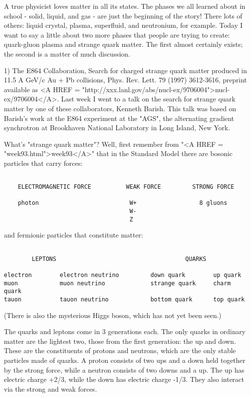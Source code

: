 


A true physicist loves matter in all its states.  The phases we all
learned about in school - solid, liquid, and gas - are just the
beginning of the story!  There lots of others: liquid crystal, plasma,
superfluid, and neutronium, for example.  Today I want to say a little
about two more phases that people are trying to create: quark-gluon
plasma and strange quark matter.  The first almost certainly exists;
the second is a matter of much discussion.

1) The E864 Collaboration, Search for charged strange quark matter
produced in 11.5 A GeV/c Au + Pb collisions, Phys. Rev. Lett. 79 (1997)
3612-3616, preprint available as 
<A HREF = "http://xxx.lanl.gov/abs/nucl-ex/9706004">nucl-ex/9706004</A>.
Last week I went to a talk on the search for strange quark matter by
one of these collaborators, Kenneth Barish.  This talk was based on
Barish's work at the E864 experiment at the "AGS", the alternating
gradient synchrotron at Brookhaven National Laboratory in Long Island,
New York.

What's "strange quark matter"?  Well, first remember from "<A HREF = "week93.html">week93</A>" that
in the Standard Model there are bosonic particles that carry forces:


\begin{verbatim}

    ELECTROMAGNETIC FORCE          WEAK FORCE         STRONG FORCE
        
    photon                          W+                  8 gluons 
                                    W-
                                    Z  
\end{verbatim}
    
and fermionic particles that constitute matter:
      

\begin{verbatim}

        LEPTONS                                     QUARKS

electron        electron neutrino         down quark        up quark
muon            muon neutrino             strange quark     charm quark
tauon           tauon neutrino            bottom quark      top quark
\end{verbatim}
    
(There is also the mysterious Higgs boson, which has not yet been seen.)

The quarks and leptons come in 3 generations each.  The only quarks in
ordinary matter are the lightest two, those from the first generation:
the up and down.  These are the constituents of protons and neutrons,
which are the only stable particles made of quarks.  A proton consists
of two ups and a down held together by the strong force, while a neutron
consists of two downs and a up.  The up has electric charge +2/3, while
the down has electric charge -1/3.  They also interact via the strong
and weak forces.

